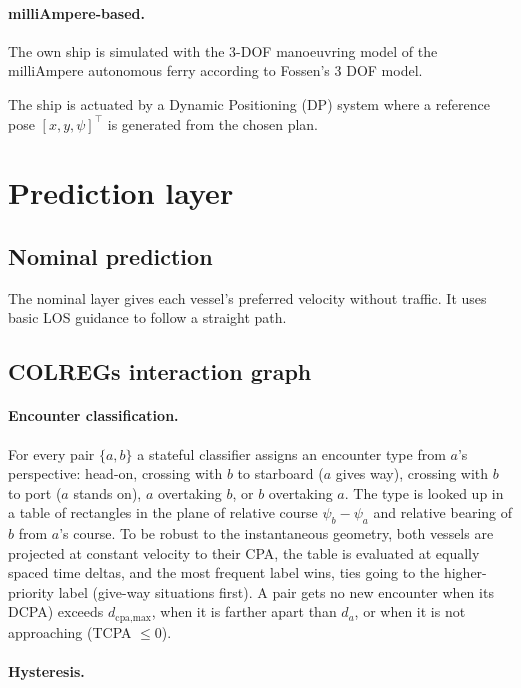 \documentclass[10pt,a4paper]{article}
\begin{document}
\paragraph{milliAmpere-based.} The own ship is simulated with the 3-DOF manoeuvring
model of the milliAmpere autonomous ferry according to Fossen's 3 DOF model.

The ship is actuated by a Dynamic Positioning (DP) system where a reference pose $[x, y, \psi]^\top$ 
is generated from the chosen plan.

\section{Prediction layer}
\subsection{Nominal prediction} \label{sec:nominal}

The nominal layer gives each vessel's preferred velocity without traffic.
It uses basic LOS guidance to follow a straight path.

\subsection{COLREGs interaction graph} \label{sec:graph}

\paragraph{Encounter classification.} 

For every pair $\{a,b\}$ a stateful
classifier assigns an encounter type from
$a$'s perspective: head-on, crossing with $b$ to starboard ($a$ gives way),
crossing with $b$ to port ($a$ stands on), $a$ overtaking $b$, or $b$ overtaking
$a$. The type is looked up in a table of rectangles in the plane of relative
course $\psi_b-\psi_a$ and relative bearing of $b$ from $a$'s course. To be
robust to the instantaneous geometry, both vessels are projected at constant
velocity to their CPA, the table is evaluated at
equally spaced time deltas, and the most frequent label wins, ties going to
the higher-priority label (give-way situations first). A pair gets no new
encounter when its DCPA) exceeds $d_{\text{cpa,max}}$, when it
is farther apart than $d_a$, or when it is not approaching (TCPA $\le 0$).

\paragraph{Hysteresis.} 
\end{document}
